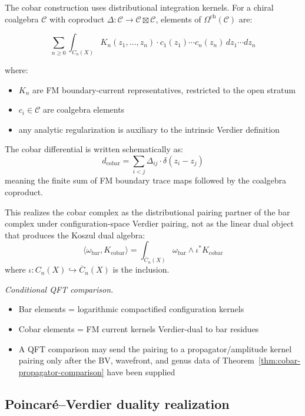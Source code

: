 \begin{example}\label{ex:cobar-kernels}
The cobar construction uses distributional integration kernels. For a chiral coalgebra $\mathcal{C}$
with coproduct $\Delta: \mathcal{C} \to \mathcal{C} \boxtimes \mathcal{C}$, elements of $\Omega^{\text{ch}}(\mathcal{C})$ are:

\[\sum_{n \geq 0} \int_{C_n(X)} K_n(z_1, \ldots, z_n) \cdot c_1(z_1) \cdots c_n(z_n) \, dz_1 \cdots dz_n\]

where:
\begin{itemize}
\item $K_n$ are FM boundary-current representatives, restricted to
 the open stratum
\item $c_i \in \mathcal{C}$ are coalgebra elements
\item any analytic regularization is auxiliary to the intrinsic
 Verdier definition
\end{itemize}

The cobar differential is written schematically as:
\[d_{\text{cobar}} = \sum_{i<j} \Delta_{ij} \cdot \delta(z_i - z_j)\]
meaning the finite sum of FM boundary trace maps followed by the
coalgebra coproduct.

This realizes the cobar complex as the distributional pairing partner
of the bar complex under configuration-space Verdier pairing, not as
the linear dual object that produces the Koszul dual algebra:
\[\langle \omega_{\text{bar}}, K_{\text{cobar}} \rangle = \int_{\overline{C}_n(X)} \omega_{\text{bar}} \wedge \iota^* K_{\text{cobar}}\]
where $\iota: C_n(X) \hookrightarrow \overline{C}_n(X)$ is the inclusion.

\emph{Conditional QFT comparison.}
\begin{itemize}
\item Bar elements = logarithmic compactified configuration kernels
\item Cobar elements = FM current kernels Verdier-dual to bar residues
\item A QFT comparison may send the pairing to a propagator/amplitude
 kernel pairing only after the BV, wavefront, and genus data of
 Theorem~\ref{thm:cobar-propagator-comparison} have been supplied
\end{itemize}
\end{example}

\subsection{Poincaré--Verdier duality realization}

